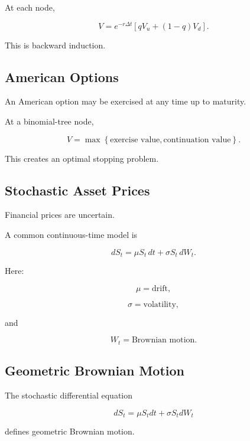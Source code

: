 At each node,

\[
\boxed{
V
=
e^{-r\Delta t}
\left[
qV_u+(1-q)V_d
\right].
}
\]

This is backward induction.

\subsection{American Options}
\label{subsec:american-options}

An American option may be exercised at any time up to maturity.

At a binomial-tree node,

\[
\boxed{
V
=
\max
\left\{
\text{exercise value},
\text{continuation value}
\right\}.
}
\]

This creates an optimal stopping problem.

\subsection{Stochastic Asset Prices}
\label{subsec:stochastic-asset-prices}

Financial prices are uncertain.

A common continuous-time model is

\[
\boxed{
dS_t
=
\mu S_t\,dt
+
\sigma S_t\,dW_t.
}
\]

Here:

\[
\mu
=
\text{drift},
\]

\[
\sigma
=
\text{volatility},
\]

and

\[
W_t
=
\text{Brownian motion}.
\]

\subsection{Geometric Brownian Motion}
\label{subsec:geometric-brownian-motion-finance}

The stochastic differential equation

\[
dS_t
=
\mu S_tdt
+
\sigma S_tdW_t
\]

defines geometric Brownian motion.

